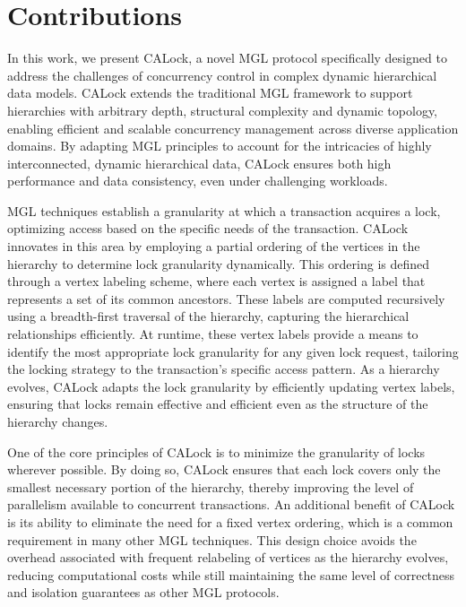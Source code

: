 \section{Contributions}

In this work, we present CALock, a novel MGL protocol specifically designed to address the challenges of concurrency control in complex dynamic hierarchical data models. CALock extends the traditional MGL framework to support hierarchies with arbitrary depth, structural complexity and dynamic topology, enabling efficient and scalable concurrency management across diverse application domains. By adapting MGL principles to account for the intricacies of highly interconnected, dynamic hierarchical data, CALock ensures both high performance and data consistency, even under challenging workloads.

MGL techniques establish a granularity at which a transaction acquires a lock, optimizing access based on the specific needs of the transaction. CALock innovates in this area by employing a partial ordering of the vertices in the hierarchy to determine lock granularity dynamically. This ordering is defined through a vertex labeling scheme, where each vertex is assigned a label that represents a set of its common ancestors. These labels are computed recursively using a breadth-first traversal of the hierarchy, capturing the hierarchical relationships efficiently. At runtime, these vertex labels provide a means to identify the most appropriate lock granularity for any given lock request, tailoring the locking strategy to the transaction’s specific access pattern. As a hierarchy evolves, CALock adapts the lock granularity by efficiently updating vertex labels, ensuring that locks remain effective and efficient even as the structure of the hierarchy changes.

One of the core principles of CALock is to minimize the granularity of locks wherever possible. By doing so, CALock ensures that each lock covers only the smallest necessary portion of the hierarchy, thereby improving the level of parallelism available to concurrent transactions. An additional benefit of CALock is its ability to eliminate the need for a fixed vertex ordering, which is a common requirement in many other MGL techniques. This design choice avoids the overhead associated with frequent relabeling of vertices as the hierarchy evolves, reducing computational costs while still maintaining the same level of correctness and isolation guarantees as other MGL protocols.


